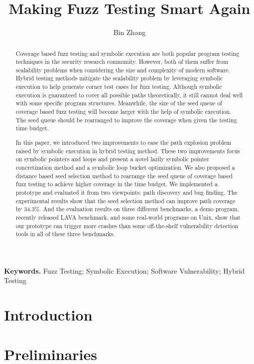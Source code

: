 \documentclass[a4paper]{article}
\begin{document}
\title{Making Fuzz Testing Smart Again}
\author{Bin Zhang}
\maketitle

\begin{abstract}
Coverage based fuzz testing and symbolic execution are both popular program testing techniques in the security research community. However, both of them suffer from scalability problems when considering the size and complexity of modern software. Hybrid testing methods mitigate the scalability problem by leveraging symbolic execution to help generate corner test cases for fuzz testing. Although symbolic execution is guaranteed to cover all possible paths theoretically, it still cannot deal well with some specific program structures. Meanwhile, the size of the seed queue of coverage based fuzz testing will become larger with the help of symbolic execution. The seed queue should be rearranged to improve the coverage when given the testing time budget.


In this paper, we introduced two improvements to ease the path explosion problem raised by symbolic execution in hybrid testing method. 
 These two improvements focus on symbolic pointers and loops and present a novel lazily symbolic pointer concretization method and a symbolic loop bucket optimization. 
 We also proposed a distance based seed selection method to rearrange the seed queue of coverage based fuzz testing to achieve higher coverage in the time budget. 
 We implemented a prototype and evaluated it from two viewpoints: path discovery and bug finding.
 The experimental results show that the seed selection method can improve path coverage by 34.3\%. And the evaluation results on three different benchmarks, a demo program, recently released LAVA benchmark, and some real-world programs on Unix, show that our prototype can trigger more crashes than some off-the-shelf vulnerability detection tools in all of these three benchmarks. 

\end{abstract}
\textbf{Keywords.} Fuzz Testing; Symbolic Execution; Software Vulnerability; Hybrid Testing

\section{Introduction} \label{sec:introduction}


\section{Preliminaries} \label{sec:preliminaries}

\end{document}
